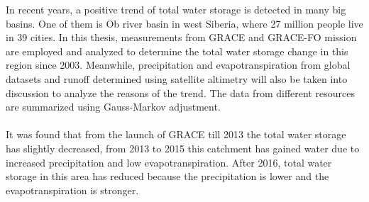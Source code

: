 In recent years, a positive trend of total water storage is detected in many big basins. One of them is Ob river basin in west Siberia, where 27 million people live in 39 cities. In this thesis, measurements from GRACE and GRACE-FO mission are employed and analyzed to determine the total water storage change in this region since 2003. Meanwhile, precipitation and evapotranspiration from global datasets and runoff determined using satellite altimetry will also be taken into discussion to analyze the reasons of the trend. The data from different resources are summarized using Gauss-Markov adjustment. \\\\
It was found that from the launch of GRACE till 2013 the total water storage has slightly decreased, from 2013 to 2015 this catchment has gained water due to increased precipitation and low evapotranspiration. After 2016, total water storage in this area has reduced because the precipitation is lower and the evapotranspiration is stronger.